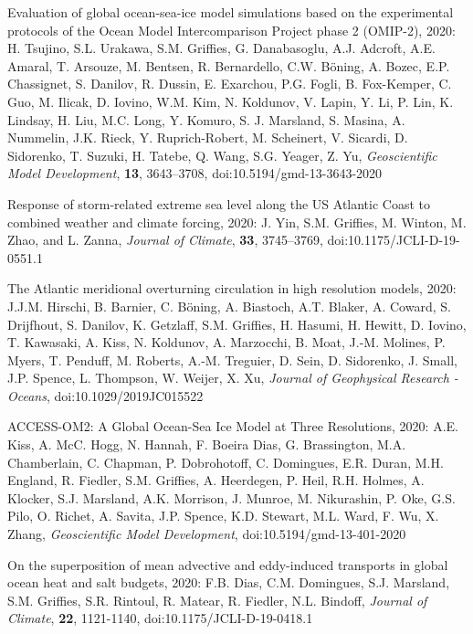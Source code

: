 \begin{etaremune}
\item Evaluation of global ocean-sea-ice model simulations based on the experimental protocols of the Ocean Model Intercomparison Project phase 2 (OMIP-2), 2020: H. Tsujino, S.L. Urakawa, S.M. Griffies, G. Danabasoglu, A.J. Adcroft, A.E. Amaral, T. Arsouze, M. Bentsen, R. Bernardello, C.W. {B\"{o}ning}, A. Bozec, E.P. Chassignet, S. Danilov, R. Dussin, E. Exarchou, P.G. Fogli, B. Fox-Kemper, C. Guo, M. Ilicak, D. Iovino, W.M. Kim, N. Koldunov, V. Lapin, Y. Li, P. Lin, K. Lindsay, H. Liu, M.C. Long, Y. Komuro, S. J. Marsland, S. Masina, A. Nummelin, J.K. Rieck, Y. Ruprich-Robert, M. Scheinert, V. Sicardi, D. Sidorenko, T. Suzuki, H. Tatebe, Q. Wang, S.G. Yeager, Z. Yu, {\it  Geoscientific Model Development}, {\bf 13}, 3643--3708, doi:10.5194/gmd-13-3643-2020

\item Response of storm-related extreme sea level along the US Atlantic Coast to combined weather and climate forcing, 2020: J. Yin, S.M. Grif\/f\/ies, M. Winton, M. Zhao, and L. Zanna, {\it Journal of Climate}, {\bf 33}, 3745--3769, doi:10.1175/JCLI-D-19-0551.1

\item The Atlantic meridional overturning circulation in high resolution models, 2020: J.J.M. Hirschi, B. Barnier, C. {B\"{o}ning}, A. Biastoch, A.T. Blaker, A. Coward, S. Drijfhout, S. Danilov, K. Getzlaff, S.M. Grif\/f\/ies, H. Hasumi, H. Hewitt, D. Iovino, T. Kawasaki, A. Kiss, N. Koldunov, A. Marzocchi, B. Moat, J.-M. Molines, P. Myers, T. Penduff, M. Roberts, A.-M. Treguier, D. Sein, D. Sidorenko, J. Small, J.P. Spence, L. Thompson, W. Weijer, X. Xu, {\it Journal of Geophysical Research - Oceans}, doi:10.1029/2019JC015522

\item ACCESS-OM2: A Global Ocean-Sea Ice Model at Three Resolutions, 2020: A.E. Kiss, A. McC. Hogg, N. Hannah, F. Boeira Dias, G. Brassington, M.A. Chamberlain, C. Chapman, P. Dobrohotoff, C. Domingues, E.R. Duran, M.H. England, R. Fiedler, S.M. Grif\/f\/ies,  A. Heerdegen, P. Heil, R.H. Holmes, A. Klocker, S.J. Marsland, A.K. Morrison, J. Munroe, M. Nikurashin, P. Oke, G.S. Pilo, O. Richet, A. Savita, J.P. Spence, K.D. Stewart, M.L. Ward, F. Wu, X. Zhang, {\it Geoscientific Model Development}, doi:10.5194/gmd-13-401-2020

\item On the superposition of mean advective and eddy-induced transports in global ocean heat and salt budgets, 2020: F.B. Dias, C.M. Domingues, S.J. Marsland, S.M. Grif\/f\/ies, S.R. Rintoul, R. Matear, R. Fiedler, N.L. Bindoff, {\it Journal of Climate}, {\bf 22}, 1121-1140, doi:10.1175/JCLI-D-19-0418.1


\end{etaremune}
